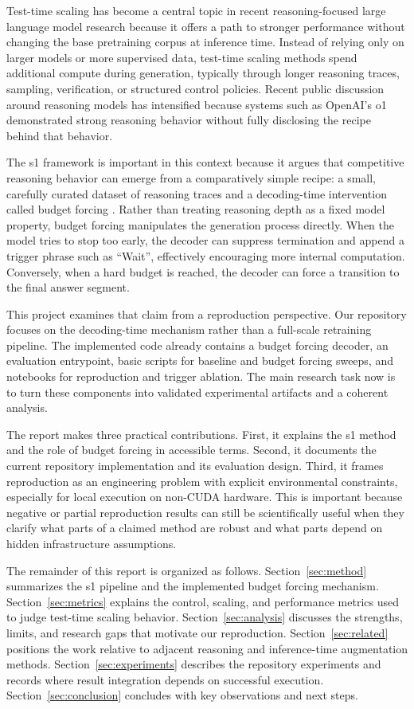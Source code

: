 Test-time scaling has become a central topic in recent reasoning-focused large language model research because it offers a path to stronger performance without changing the base pretraining corpus at inference time. Instead of relying only on larger models or more supervised data, test-time scaling methods spend additional compute during generation, typically through longer reasoning traces, sampling, verification, or structured control policies. Recent public discussion around reasoning models has intensified because systems such as OpenAI's o1 demonstrated strong reasoning behavior without fully disclosing the recipe behind that behavior.

The s1 framework is important in this context because it argues that competitive reasoning behavior can emerge from a comparatively simple recipe: a small, carefully curated dataset of reasoning traces and a decoding-time intervention called budget forcing \citep{muennighoff2025s1}. Rather than treating reasoning depth as a fixed model property, budget forcing manipulates the generation process directly. When the model tries to stop too early, the decoder can suppress termination and append a trigger phrase such as ``Wait'', effectively encouraging more internal computation. Conversely, when a hard budget is reached, the decoder can force a transition to the final answer segment.

This project examines that claim from a reproduction perspective. Our repository focuses on the decoding-time mechanism rather than a full-scale retraining pipeline. The implemented code already contains a budget forcing decoder, an evaluation entrypoint, basic scripts for baseline and budget forcing sweeps, and notebooks for reproduction and trigger ablation. The main research task now is to turn these components into validated experimental artifacts and a coherent analysis.

The report makes three practical contributions. First, it explains the s1 method and the role of budget forcing in accessible terms. Second, it documents the current repository implementation and its evaluation design. Third, it frames reproduction as an engineering problem with explicit environmental constraints, especially for local execution on non-CUDA hardware. This is important because negative or partial reproduction results can still be scientifically useful when they clarify what parts of a claimed method are robust and what parts depend on hidden infrastructure assumptions.

The remainder of this report is organized as follows. Section~\ref{sec:method} summarizes the s1 pipeline and the implemented budget forcing mechanism. Section~\ref{sec:metrics} explains the control, scaling, and performance metrics used to judge test-time scaling behavior. Section~\ref{sec:analysis} discusses the strengths, limits, and research gaps that motivate our reproduction. Section~\ref{sec:related} positions the work relative to adjacent reasoning and inference-time augmentation methods. Section~\ref{sec:experiments} describes the repository experiments and records where result integration depends on successful execution. Section~\ref{sec:conclusion} concludes with key observations and next steps.